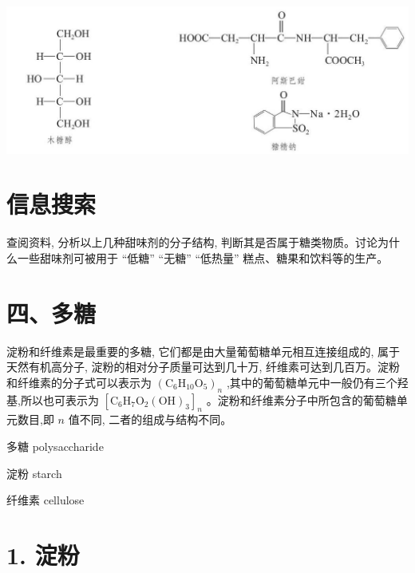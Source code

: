 \documentclass[10pt]{article}
\begin{document}
\begin{center}
\includegraphics[max width=1.0\textwidth]{images/0190efc5-b58a-7c43-bfb0-e0a030df9cfd_112_503733.jpg}
\end{center}

\section*{信息搜索}

查阅资料, 分析以上几种甜味剂的分子结构, 判断其是否属于糖类物质。讨论为什么一些甜味剂可被用于 “低糖” “无糖” “低热量” 糕点、糖果和饮料等的生产。

\section*{四、多糖}

淀粉和纤维素是最重要的多糖, 它们都是由大量葡萄糖单元相互连接组成的, 属于天然有机高分子, 淀粉的相对分子质量可达到几十万, 纤维素可达到几百万。淀粉和纤维素的分子式可以表示为 \({\left( {\mathrm{C}}_{6}{\mathrm{H}}_{10}{\mathrm{O}}_{5}\right) }_{n}\) ,其中的葡萄糖单元中一般仍有三个羟基,所以也可表示为 \({\left\lbrack {\mathrm{C}}_{6}{\mathrm{H}}_{7}{\mathrm{O}}_{2}{\left( \mathrm{{OH}}\right) }_{3}\right\rbrack }_{n}\) 。淀粉和纤维素分子中所包含的葡萄糖单元数目,即 \(n\) 值不同, 二者的组成与结构不同。

\begin{mdframed}

多糖 polysaccharide

淀粉 starch

纤维素 cellulose

\end{mdframed}

\section*{1. 淀粉}
\end{document}
